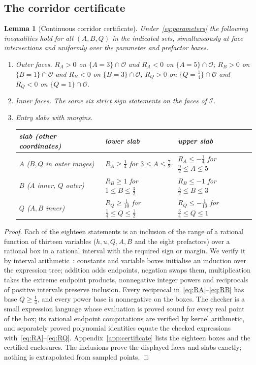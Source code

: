 \documentclass[11pt,a4paper]{article}
\theoremstyle{plain}
\newtheorem{lemma}[theorem]{Lemma}
\theoremstyle{definition}
\theoremstyle{remark}
\newcommand{\calO}{\mathcal O}
\newcommand{\calI}{\mathcal I}
\begin{document}
\subsection{The corridor certificate}
\begin{lemma}[Continuous corridor certificate]\label{lem:corridor}
Under~\eqref{eq:parameters} the following inequalities hold for all $(A,B,Q)$ in the indicated sets, simultaneously at face intersections and uniformly over the parameter and prefactor boxes.
\begin{enumerate}[label=(\alph*)]
\item \emph{Outer faces.} $R_A>0$ on $\{A=3\}\cap\calO$ and $R_A<0$ on $\{A=5\}\cap\calO$; $R_B>0$ on $\{B=1\}\cap\calO$ and $R_B<0$ on $\{B=3\}\cap\calO$; $R_Q>0$ on $\{Q=\tfrac14\}\cap\calO$ and $R_Q<0$ on $\{Q=1\}\cap\calO$.
\item \emph{Inner faces.} The same six strict sign statements on the faces of $\calI$.
\item \emph{Entry slabs with margins.}
\begin{center}\small\renewcommand{\arraystretch}{1.35}
\begin{tabular}{lll}
\toprule
slab (other coordinates) & lower slab & upper slab\\
\midrule
$A$ ($B,Q$ in outer ranges) & $R_A\ge\tfrac14$ for $3\le A\le\tfrac72$ & $R_A\le-\tfrac14$ for $\tfrac92\le A\le5$\\
$B$ ($A$ inner, $Q$ outer) & $R_B\ge1$ for $1\le B\le\tfrac32$ & $R_B\le-1$ for $\tfrac52\le B\le3$\\
$Q$ ($A,B$ inner) & $R_Q\ge\tfrac1{10}$ for $\tfrac14\le Q\le\tfrac12$ & $R_Q\le-\tfrac1{10}$ for $\tfrac34\le Q\le1$\\
\bottomrule
\end{tabular}
\end{center}
\end{enumerate}
\end{lemma}

\begin{proof}
Each of the eighteen statements is an inclusion of the range of a rational function of thirteen variables ($h,u,Q,A,B$ and the eight prefactors) over a rational box in a rational interval with the required sign or margin. We verify it by interval arithmetic~\cite{MooreKearfottCloud2009,Tucker2011}: constants and variable boxes initialise an induction over the expression tree; addition adds endpoints, negation swaps them, multiplication takes the extreme endpoint products, nonnegative integer powers and reciprocals of positive intervals preserve inclusion. Every reciprocal in~\eqref{eq:RA}--\eqref{eq:RB} has base $Q\ge\tfrac14$, and every power base is nonnegative on the boxes. The checker is a small expression language whose evaluation is proved sound for every real point of the box; its rational endpoint computations are verified by kernel arithmetic, and separately proved polynomial identities equate the checked expressions with~\eqref{eq:RA}--\eqref{eq:RQ}. Appendix~\ref{app:certificate} lists the eighteen boxes and the certified enclosures. The inclusions prove the displayed faces and slabs exactly; nothing is extrapolated from sampled points.
\end{proof}
\end{document}
